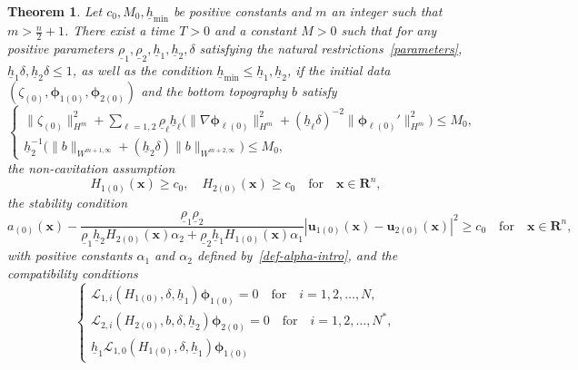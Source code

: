 \documentclass[11pt,leqno]{article}
\newtheorem{theorem}{\bf Theorem}[section]
\numberwithin{equation}{section}
\numberwithin{figure}{section}
\begin{document}
\begin{theorem}\label{theorem-uniform}
Let $c_0, M_0, \underline{h}_\mathrm{min}$ be positive constants and $m$ an integer such that ${m>\frac{n}{2}+1}$. 
There exist a time $T>0$ and a constant $M>0$ such that for any positive parameters 
$\underline{\rho}_1, \underline{\rho}_2, \underline{h}_1, \underline{h}_2, \delta$ satisfying the natural 
restrictions~\eqref{parameters}, $\underline{h}_1\delta, \underline{h}_2\delta \leq 1$, as well as the condition 
${\underline{h}_\mathrm{min} \leq \underline{h}_1, \underline{h}_2}$, 
if the initial data $(\zeta_{(0)},\bm{\phi}_{1(0)},\bm{\phi}_{2(0)})$ 
and the bottom topography $b$ satisfy 
%
\begin{equation}\label{uniform-ini}
\begin{cases}
\displaystyle
\|\zeta_{(0)}\|_{H^m}^2 + \sum_{\ell=1,2}\underline{\rho}_\ell\underline{h}_\ell\bigl(
 \|\nabla\bm{\phi}_{\ell(0)}\|_{H^m}^2 + (\underline{h}_\ell\delta)^{-2}\|\bm{\phi}_{\ell(0)}'\|_{H^m}^2\bigr) \leq M_0, \\
\underline{h}_2^{-1}\bigl(\|b\|_{W^{m+1,\infty}} + (\underline{h}_2\delta)\|b\|_{W^{m+2,\infty}} \bigr) \leq M_0,
\end{cases}
\end{equation}
%
the non-cavitation assumption 
%
\begin{equation}\label{NonCavitation}
H_{1(0)}(\bm{x}) \geq c_0, \quad H_{2(0)}(\bm{x}) \geq c_0 \quad\mbox{for}\quad \bm{x}\in\mathbf{R}^n,
\end{equation}
%
the stability condition
%
\begin{equation}\label{Stability}
 a_{(0)}(\bm{x})- \frac{\underline{\rho}_1\underline{\rho}_2}{
  \underline{\rho}_1\underline{h}_2H_{2(0)}(\bm{x})\alpha_2 + \underline{\rho}_2\underline{h}_1H_{1(0)}(\bm{x})\alpha_1}
  |{\bm u}_{1(0)}(\bm{x})-{\bm u}_{2(0)}(\bm{x})|^2 \geq c_0 \quad\mbox{for}\quad \bm{x}\in\mathbf{R}^n,
\end{equation}
%
with positive constants $\alpha_1$ and $\alpha_2$ defined by~\eqref{def-alpha-intro}, and the compatibility conditions 
%
\begin{equation}\label{Compatibility}
\begin{cases}
 \mathcal{L}_{1,i}(H_{1(0)},\delta,\underline{h}_1) {\bm \phi}_{1(0)} = 0 \quad\mbox{for}\quad i=1,2,\ldots,N, \\
 \mathcal{L}_{2,i}(H_{2(0)},b,\delta,\underline{h}_2) {\bm \phi}_{2(0)} = 0 \quad\mbox{for}\quad i=1,2,\ldots,N^*, \\
 \underline{h}_1\mathcal{L}_{1,0}(H_{1(0)},\delta,\underline{h}_1)  {\bm \phi}_{1(0)}

\end{cases}
\end{equation}
\end{theorem}
\end{document}
